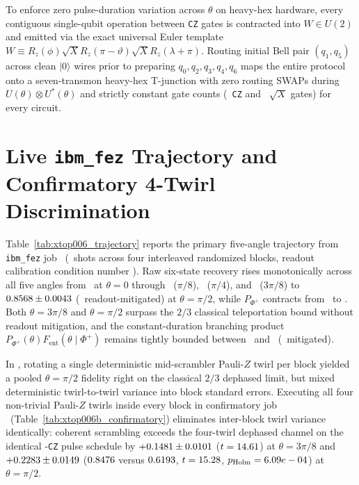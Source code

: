 \documentclass[aps,prx,twocolumn,superscriptaddress,nofootinbib]{revtex4-2}
\begin{document}
To enforce zero pulse-duration variation across $\theta$ on heavy-hex hardware, every contiguous single-qubit operation between \texttt{CZ} gates is contracted into $W \in U(2)$ and emitted via the exact universal Euler template $W \equiv R_z(\phi)\sqrt{X}R_z(\pi-\vartheta)\sqrt{X}R_z(\lambda+\pi)$. Routing initial Bell pair $(q_1, q_5)$ across clean $|0\rangle$ wires prior to preparing $q_0, q_2, q_3, q_4, q_6$ maps the entire protocol onto a seven-transmon heavy-hex T-junction with zero routing SWAPs during $U(\theta)\otimes U^*(\theta)$ and strictly constant gate counts (\XtopConstCZ\ \texttt{CZ} and \XtopConstSX\ $\sqrt{X}$ gates) for every circuit.

\section{Live \texttt{ibm\_fez} Trajectory and Confirmatory 4-Twirl Discrimination}
\XtopTrajectoryTable

Table~\ref{tab:xtop006_trajectory} reports the primary five-angle trajectory from \texttt{ibm\_fez} job \XtopJobA\ (\XtopShotsA\ shots across four interleaved randomized blocks, readout calibration condition number \XtopRoCond). Raw six-state recovery rises monotonically across all five angles from \XtopFZeroRaw\ at $\theta = 0$ through \XtopFPiEightRaw\ ($\pi/8$), \XtopFPiFourRaw\ ($\pi/4$), and \XtopFThreePiEightRaw\ ($3\pi/8$) to $0.8568 \pm 0.0043$ (\XtopFPiTwoMit\ readout-mitigated) at $\theta = \pi/2$, while $P_{\Phi^+}$ contracts from \XtopPZeroRaw\ to \XtopPPiTwoRaw. Both $\theta = 3\pi/8$ and $\theta = \pi/2$ surpass the $2/3$ classical teleportation bound without readout mitigation, and the constant-duration branching product $P_{\Phi^+}(\theta)F_{\mathrm{ent}}(\theta \mid \Phi^+)$ remains tightly bounded between \XtopYKZeroRaw\ and \XtopYKPiTwoRaw\ (\XtopYKPiTwoMit\ mitigated).

\XtopConfirmatoryTable

In \XtopJobA, rotating a single deterministic mid-scrambler Pauli-$Z$ twirl per block yielded a pooled $\theta=\pi/2$ fidelity right on the classical $2/3$ dephased limit, but mixed deterministic twirl-to-twirl variance into block standard errors. Executing all four non-trivial Pauli-$Z$ twirls inside every block in confirmatory job \XtopJobB\ (Table~\ref{tab:xtop006b_confirmatory}) eliminates inter-block twirl variance identically: coherent scrambling exceeds the four-twirl dephased channel on the identical \XtopConstCZ-\texttt{CZ} pulse schedule by $+0.1481 \pm 0.0101$ ($t = 14.61$) at $\theta = 3\pi/8$ and $+0.2283 \pm 0.0149$ ($0.8476$ versus $0.6193$, $t = 15.28$, $p_{\mathrm{Holm}} = 6.09e-04$) at $\theta = \pi/2$.
\end{document}
